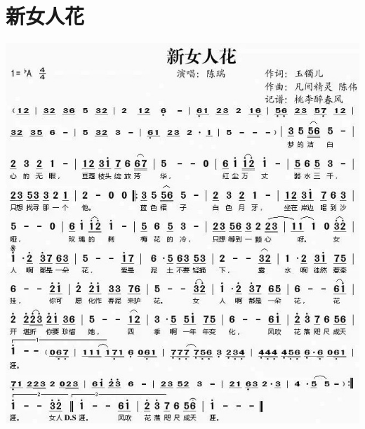 \documentclass[cn,pad,twocol]{elegantbook}
\begin{document}
\section{新女人花}\includegraphics[width=\textwidth]{dongxiao/20200819/新女人花.jpeg}
\end{document}
